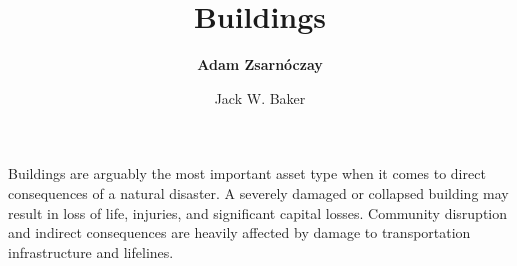 %
%
%


%
%
%
%
%
%
%
%

\title{Buildings}
\author{
    \textbf{Adam Zsarnóczay}
    \and Jack W. Baker}
\tocauthor{}
%
%
\maketitle

Buildings are arguably the most important asset type when it comes to direct consequences of a natural disaster. A severely damaged or collapsed building may result in loss of life, injuries, and significant capital losses. Community disruption and indirect consequences are heavily affected by damage to transportation infrastructure and lifelines.

